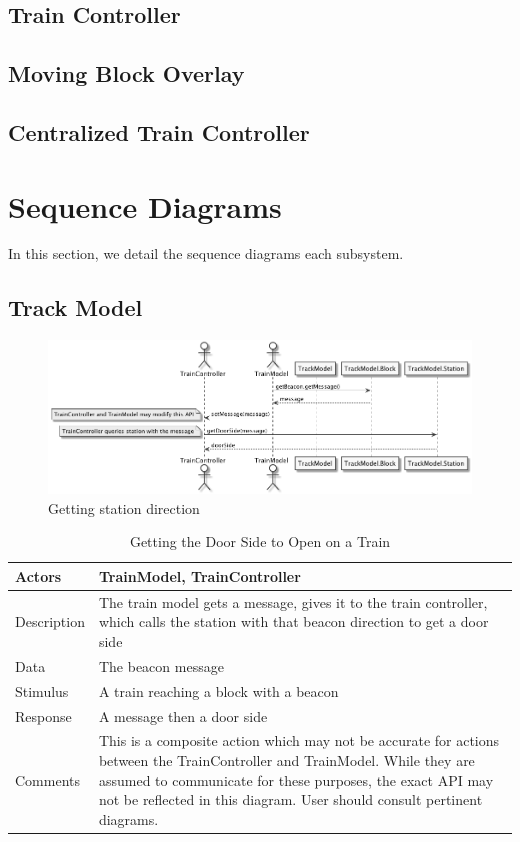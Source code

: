 \documentclass[]{article}
\begin{document}
\subsection{Train Controller}
\subsection{Moving Block Overlay}
\subsection{Centralized Train Controller}


\section{Sequence Diagrams}
In this section, we detail the sequence diagrams each subsystem.
\subsection{Track Model}
\begin{figure}[H]
	\centering
	\includegraphics[scale=.5]{getStationDirection.png}
	\caption{Getting station direction}
\end{figure}
\begin{table}[H]
	\centering
	\caption{Getting the Door Side to Open on a Train}
	\begin{tabular}{|l|l|}
		\hline
		Actors & \parbox[t]{10cm}{TrainModel, TrainController} \\ \hline
		Description & \parbox[t]{10cm}{The train model gets a message, gives it to the train controller, which calls the station with that beacon direction to get a door side} \\ \hline
		Data &  \parbox[t]{10cm}{The beacon message} \\ \hline
		Stimulus &  \parbox[t]{10cm}{A train reaching a block with a beacon} \\ \hline
		Response & \parbox[t]{10cm}{A message then a door side}\\ \hline
		Comments & \parbox[t]{10cm}{This is a composite action which may not be accurate for actions between the TrainController and TrainModel. While they are assumed to communicate for these purposes, the exact API may not be reflected in this diagram. User should consult pertinent diagrams.}  \\ \hline
	\end{tabular}
\end{table}
\end{document}
